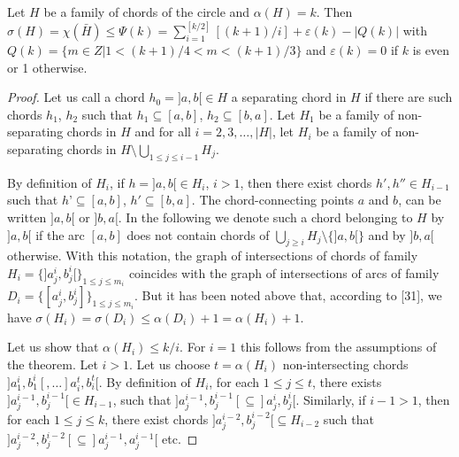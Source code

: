 \documentclass{article}
\begin{document}
    \begin{thm}
        Let $H$ be a family 
        of chords of the 
        circle and $\alpha\left(H\right) = k $.
        Then $\sigma(H) = \chi(\bar{H}) \leq 
        \Psi(k) = \sum_{i = 1}^{[k/2]}[(k+1)/i] 
        + \varepsilon\left(k\right) - \left|Q(k)\right|$ 
        with $Q(k) = \{m \in Z | 1< (k+1)/4 < m < (k+1)/3\}$ 
        and $\varepsilon\left(k\right) = 0$ 
        if $k$ is even or 1 otherwise.
    \end{thm}
    \begin{proof}
        Let us call a chord 
        $h_0 = ]a, b[ \in H$ 
        a separating chord in $H$ 
        if there are such chords 
        $h_1$, $h_2$ such that 
        $h_1 \subseteq [a, b]$, 
        $h_2 \subseteq [b,a]$. 
        Let $H_1$ be a family 
        of non-separating chords 
        in $H$ and for all 
        $i = 2, 3, \ldots, |H|$, 
        let $H_i$ be a family of 
        non-separating chords in 
        $H \setminus \bigcup_{1 \leq j \leq i-1} H_{j}$.

        By definition of $H_i$, 
        if $h = ]a, b[ \in H_i$, $i > 1$, 
        then there exist chords 
        $h', h'' \in H_{i-1}$ 
        such that $h’ \subseteq [a, b]$, 
        $h' \subseteq [b, a]$. 
        The chord-connecting points 
        $a$ and $b$, can be written 
        $]a, b[$ or $]b, a[$. 
        In the following we denote 
        such a chord belonging to $H$ 
        by $]a, b[$ if the arc $[a, b]$ 
        does not contain chords of 
        $\bigcup_{j \geq i} H_j \setminus \{]a, b[\}$ 
        and by $]b, a[$ otherwise. 
        With this notation, 
        the graph of intersections 
        of chords of family 
        $H_i = \{]a^i_j, b^i_j[\}_{1 \leq j \leq m_i}$ 
        coincides with the graph 
        of intersections of arcs 
        of family $D_i = \{[a^i_j, b^i_j]\}_{1 \leq j \leq m_i}$. 
        But it has been noted above that, 
        according to [31],  we have $\sigma\left(H_{i}\right)= 
        \sigma(D_i) \leq \alpha(D_i)+1 = 
        \alpha(H_i) + 1$. 

        Let us show that $\alpha(H_i) \leq k/i$. 
        For $i = 1$ this follows from 
        the assumptions of the theorem. 
        Let $i > 1$. Let us choose $t = \alpha(H_i)$ 
        non-intersecting chords $]a^i_1, b^i_1[,
        \ldots ]a^t_i, b^t_i[$.
        By definition of $H_{i}$, for each
        $1 \leq j \leq t$, there exists
        $]a^{i-1}_{j}, b^{i-1}_{j}[ \in H_{i-1}$,
        such that $]a^{i-1}_{j}, b^{i-1}_{j}[
        \subseteq ]a^{i}_{j}, b^{i}_{j}[$.
        Similarly, if $i - 1> 1$, 
        then for each $1 \leq j \leq k$, 
        there exist chords $]a^{i-2}_{j}, b^{i-2}_{j}[
        \subseteq H_{i-2}$ such that
        $]a^{i-2}_{j}, b^{i-2}_{j}[ \subseteq 
        ]a^{i-1}_{j}, a^{i-1}_{j}[$ etc.
        

\end{proof}
\end{document}
